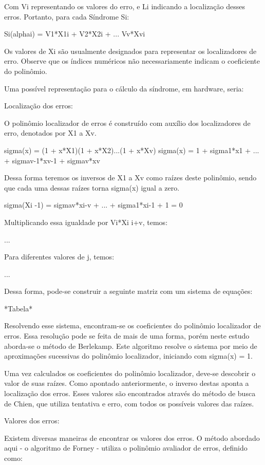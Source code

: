 	Com Vi representando os valores do erro, e Li indicando a localização desses erros. Portanto, para cada Síndrome Si:
	
	Si(alphai) = V1*X1i + V2*X2i + ... Vv*Xvi
	
	Os valores de Xi são usualmente designados para representar os localizadores de erro. Observe que os índices numéricos não necessariamente indicam o coeficiente do polinômio.
	
	Uma possível representação para o cálculo da síndrome, em hardware, seria:
	
	Localização dos erros:
	
	O polinômio localizador de erros é construído com auxílio dos localizadores de erro, denotados por X1 a Xv.
	
	sigma(x) = (1 + x*X1)(1 + x*X2)...(1 + x*Xv)
	sigma(x) =  1 + sigma1*x1 + ... + sigmav-1*xv-1 + sigmav*xv
	
	Dessa forma teremos os inversos de X1 a Xv como raízes deste polinômio, sendo que cada uma dessas raízes torna sigma(x) igual a zero. 
	
	sigma(Xi -1) = sigmav*xi-v + ... + sigma1*xi-1 + 1 = 0
	
	Multiplicando essa igualdade por Vi*Xi i+v, temos:
	
	...
	
	Para diferentes valores de j, temos:
	
	...
	
	Dessa forma, pode-se construir a seguinte matriz com um sistema de equações:
	
	*Tabela*
	
	
	Resolvendo esse sistema, encontram-se os coeficientes do polinômio localizador de erros. Essa resolução pode se feita de mais de uma forma, porém neste estudo aborda-se o método de Berlekamp. Este algoritmo resolve o sistema por meio de aproximações sucessivas do polinômio localizador, iniciando com sigma(x) = 1.
	
	Uma vez calculados os coeficientes do polinômio localizador, 
	deve-se descobrir o valor de suas raízes. Como apontado anteriormente, o inverso destas aponta a localização dos erros. Esses valores são encontrados através do método de busca de Chien, que utiliza tentativa e erro, com todos os possíveis valores das raízes.
	
	Valores dos erros:
	
	Existem diversas maneiras de encontrar os valores dos erros. O método abordado aqui - o algoritmo de Forney - utiliza o polinômio avaliador de erros, definido como:
	
